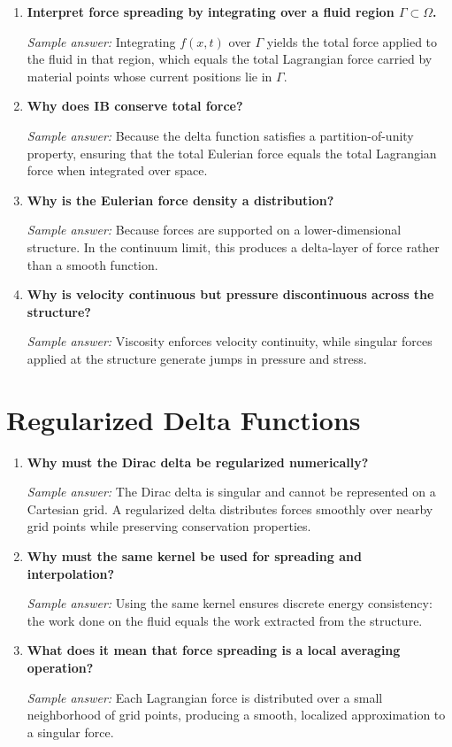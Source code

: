 \documentclass[11pt]{article}
\begin{document}
\begin{enumerate}[label=\arabic*., resume]

\item \textbf{Interpret force spreading by integrating over a fluid region $\Gamma \subset \Omega$.}

\textit{Sample answer:}  
Integrating $f(x,t)$ over $\Gamma$ yields the total force applied to the fluid in that region, which equals the total Lagrangian force carried by material points whose current positions lie in $\Gamma$.

\item \textbf{Why does IB conserve total force?}

\textit{Sample answer:}  
Because the delta function satisfies a partition-of-unity property, ensuring that the total Eulerian force equals the total Lagrangian force when integrated over space.

\item \textbf{Why is the Eulerian force density a distribution?}

\textit{Sample answer:}  
Because forces are supported on a lower-dimensional structure. In the continuum limit, this produces a delta-layer of force rather than a smooth function.

\item \textbf{Why is velocity continuous but pressure discontinuous across the structure?}

\textit{Sample answer:}  
Viscosity enforces velocity continuity, while singular forces applied at the structure generate jumps in pressure and stress.

\end{enumerate}

\section*{Regularized Delta Functions}

\begin{enumerate}[label=\arabic*., resume]

\item \textbf{Why must the Dirac delta be regularized numerically?}

\textit{Sample answer:}  
The Dirac delta is singular and cannot be represented on a Cartesian grid. A regularized delta distributes forces smoothly over nearby grid points while preserving conservation properties.

\item \textbf{Why must the same kernel be used for spreading and interpolation?}

\textit{Sample answer:}  
Using the same kernel ensures discrete energy consistency: the work done on the fluid equals the work extracted from the structure.

\item \textbf{What does it mean that force spreading is a local averaging operation?}

\textit{Sample answer:}  
Each Lagrangian force is distributed over a small neighborhood of grid points, producing a smooth, localized approximation to a singular force.

\end{enumerate}
\end{document}
